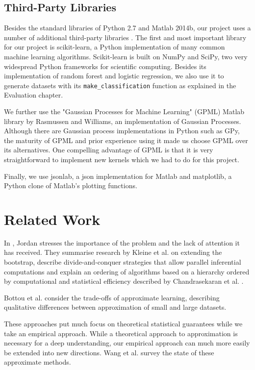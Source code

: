 \documentclass[a4paper,12pt,twoside,openright]{report}
\begin{document}
\section{Third-Party Libraries}
Besides the standard libraries of Python 2.7 and Matlab 2014b, our project uses a number of additional third-party libraries . The first and most important library for our project is scikit-learn, a Python implementation of many common machine learning algorithms. Scikit-learn is built on NumPy and SciPy, two very widespread Python frameworks for scientific computing. Besides its implementation of random forest and logistic regression, we also use it to generate datasets with its \texttt{make\_classification} function as explained in the Evaluation chapter.

We further use the "Gaussian Processes for Machine Learning" (GPML) Matlab library by Rasmussen and Williams, an implementation of Gaussian Processes. Although there are Gaussian process implementations in Python such as GPy, the maturity of GPML and prior experience using it made us choose GPML over its alternatives. One compelling advantage of GPML is that it is very straightforward to implement new kernels which we had to do for this project.

Finally, we use jsonlab, a json implementation for Matlab and matplotlib, a Python clone of Matlab's plotting functions.



\chapter{Related Work}


In \cite{jordan2013}, Jordan stresses the importance of the problem and the lack of attention it has received. They summarise research by Kleine et al. \cite{RSSB:RSSB12050} on extending the bootstrap, describe divide-and-conquer strategies that allow parallel inferential computations and explain an ordering of algorithms based on a hierarchy ordered by computational and statistical efficiency described by Chandrasekaran et al. \cite{Chandrasekaran26032013}.

Bottou et al. \cite{Bottou08thetradeoffs} consider the trade-offs of approximate learning, describing qualitative differences between approximation of small and large datasets. 

These approaches put much focus on theoretical statistical guarantees while we take an empirical approach. While a theoretical approach to approximation is necessary for a deep understanding, our empirical approach can much more easily be extended into new directions. Wang et al. \cite{2015arXiv150207989W} survey the state of these approximate methods.
\end{document}
